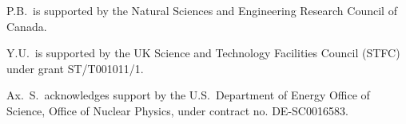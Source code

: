\documentclass[pdflatex,sn-mathphys,Numbered,iicol]{sn-jnl}
\begin{document}
P.B.~is supported by the Natural Sciences and Engineering Research Council of Canada.

Y.U.~is supported by the UK Science and Technology Facilities Council (STFC) under grant ST/T001011/1.

Ax.~S.\ acknowledges support by the U.S.\ Department of Energy Office of Science, Office of Nuclear Physics, under contract no. DE-SC0016583.

\newpage



\end{document}
